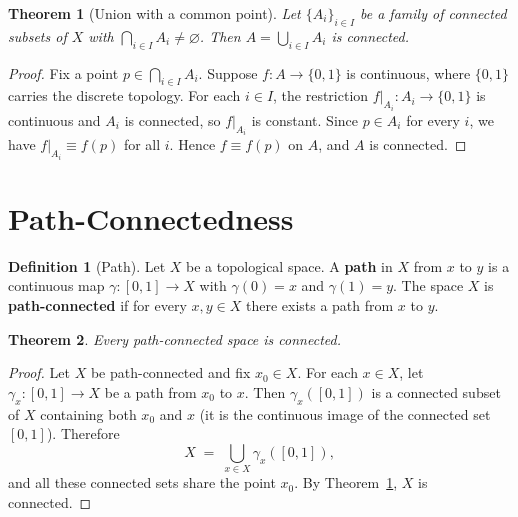 \documentclass[11pt,a4paper,twoside]{book}
\newtheorem{theorem}{Theorem}[section]
\theoremstyle{remark}
\theoremstyle{definition}
\theoremstyle{definition}
\newtheorem{definition}{Definition}[section]
\begin{document}
\begin{theorem}[Union with a common point]
\label{thm:union-connected-common-point}
Let $\{A_i\}_{i\in I}$ be a family of connected subsets of $X$
with $\bigcap_{i\in I}A_i\neq\varnothing$.  Then
$A=\bigcup_{i\in I}A_i$ is connected.
\end{theorem}

\begin{proof}
Fix a point $p\in\bigcap_{i\in I}A_i$.  Suppose $f\colon A\to\{0,1\}$
is continuous, where $\{0,1\}$ carries the discrete topology.  For
each $i\in I$, the restriction $f|_{A_i}\colon A_i\to\{0,1\}$ is
continuous and $A_i$ is connected, so $f|_{A_i}$ is constant.  Since
$p\in A_i$ for every $i$, we have $f|_{A_i}\equiv f(p)$ for all $i$.
Hence $f\equiv f(p)$ on $A$, and $A$ is connected.
\end{proof}

\section{Path-Connectedness}\label{sec:path-connected}

\begin{definition}[Path]\label{def:path}
Let $X$ be a topological space.  A \textbf{path} in $X$ from $x$ to $y$
is a continuous map $\gamma\colon[0,1]\to X$ with $\gamma(0)=x$ and
$\gamma(1)=y$.  The space $X$ is \textbf{path-connected}
if for every $x,y\in X$ there exists a path from $x$ to $y$.
\end{definition}

\begin{theorem}\label{thm:path-implies-connected}
Every path-connected space is connected.
\end{theorem}

\begin{proof}
Let $X$ be path-connected and fix $x_0\in X$.  For each $x\in X$,
let $\gamma_x\colon[0,1]\to X$ be a path from $x_0$ to $x$.  Then
$\gamma_x([0,1])$ is a connected subset of $X$ containing both $x_0$
and $x$ (it is the continuous image of the connected set $[0,1]$).
Therefore
\[
  X \;=\; \bigcup_{x\in X}\gamma_x([0,1]),
\]
and all these connected sets share the point $x_0$.  By
Theorem~\ref{thm:union-connected-common-point}, $X$ is connected.
\end{proof}
\end{document}
